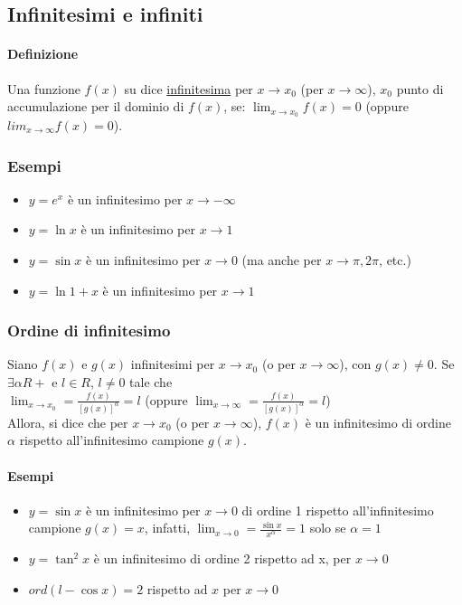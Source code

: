 \subsection{Infinitesimi e infiniti}
\paragraph{Definizione}
Una funzione $f(x)$ su dice \underline{infinitesima} per $x\to x_0$ (per $x\to \infty$), $x_0$ punto di accumulazione per il dominio di $f(x)$, se: $\lim_{x\to x_0}f(x)=0$ (oppure $lim_{x\to \infty}f(x)=0$).
\subsubsection{Esempi}
\begin{itemize}
	\item $y=e^x$ è un infinitesimo per $x\to -\infty$
	\item $y=\ln{x}$ è un infinitesimo per $x\to 1$
	\item $y=\sin{x}$ è un infinitesimo per $x\to 0$ (ma anche per $x\to \pi,2\pi$, etc.)
	\item $y=\ln{1+x}$ è un infinitesimo per $x\to 1$ 
\end{itemize}
\subsubsection{Ordine di infinitesimo}
Siano $f(x)$ e $g(x)$ infinitesimi per $x\to{x_0}$ (o per $x\to \infty$), con $g(x)\neq 0$. Se $\exists\alpha R+$ e $l\in R$, $l\neq 0$ tale che\\
$\lim_{x\to{x_0}}=\frac{f(x)}{[g(x)]^\alpha}=l$ (oppure $\lim_{x\to{\infty}}=\frac{f(x)}{[g(x)]^\alpha}=l$)\\
Allora, si dice che per $x\to x_0$ (o per $x\to \infty$), $f(x)$ è un infinitesimo di ordine $\alpha$ rispetto all'infinitesimo campione $g(x)$.
\paragraph{Esempi}
\begin{itemize}
	\item $y=\sin{x}$ è un infinitesimo per $x\to 0$ di ordine 1 rispetto all'infinitesimo campione $g(x)=x$, infatti, $\lim_{x\to 0}=\frac{\sin{x}}{x^\alpha}=1$ solo se $\alpha = 1$
	\item $y=\tan^2x$ è un infinitesimo di ordine 2 rispetto ad x, per $x\to 0$
	\item $ord(l-\cos{x})=2$ rispetto ad $x$ per $x\to 0$
\end{itemize}
